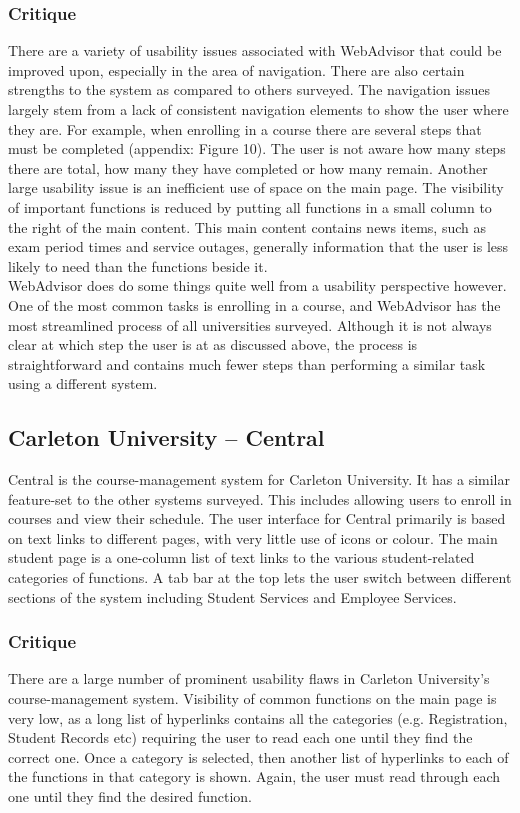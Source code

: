 \documentclass[10pt]{article}
\begin{document}
\begin{multicols}{2}
\subsubsection*{Critique}
There are a variety of usability issues associated with \mbox{WebAdvisor} that 
could be improved upon, especially in the area of navigation. There are also 
certain strengths to the system as compared to others surveyed. The navigation 
issues largely stem from a lack of consistent navigation elements to show the 
user where they are. For example, when enrolling in a course there are several 
steps that must be completed (appendix: Figure 10). The user is not aware how many steps there are total, how many they 
have completed or how many remain. Another large usability issue is an 
inefficient use of space on the main page. The visibility of important functions 
is reduced by putting all functions in a small column to the right of the main 
content. This main content contains news items, such as exam period times and 
service outages, generally information that the user is less likely to need than 
the functions beside it.\\

WebAdvisor does do some things quite well from a usability perspective however. 
One of the most common tasks is enrolling in a course, and WebAdvisor has the 
most streamlined process of all universities surveyed. Although it is not always 
clear at which step the user is at as discussed above, the process is 
straightforward and contains much fewer steps than performing a similar task 
using a different system.

\subsection*{Carleton University -- Central}
Central is the course-management system for Carleton University. It has a 
similar feature-set to the other systems surveyed. This includes allowing users 
to enroll in courses and view their schedule. The user interface for Central 
primarily is based on text links to different pages, with very little use of 
icons or colour. The main student page is a one-column list of text links to the 
various student-related categories of functions. A tab bar at the top lets the 
user switch between different sections of the system including Student Services 
and Employee Services.

\subsubsection*{Critique}
There are a large number of prominent usability flaws in Carleton University's 
course-management system. Visibility of common functions on the main 
page is very low, as a long list of hyperlinks contains all the categories (e.g. 
Registration, Student Records etc) requiring the user to read each one until 
they find the correct one. Once a category is selected, then another list of 
hyperlinks to each of the functions in that category is shown. 
Again, the user must read through each one until they find the desired function.\\


\end{multicols}
\end{document}
